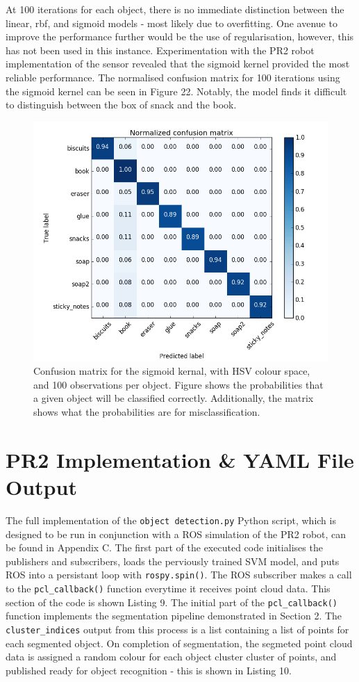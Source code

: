 \documentclass[a4paper]{article}
\begin{document}
At 100 iterations for each object, there is no immediate distinction between the linear, rbf, and sigmoid models - most likely due to overfitting. One avenue to improve the performance further would be the use of regularisation, however, this has not been used in this instance. Experimentation with the PR2 robot implementation of the sensor revealed that the sigmoid kernel provided the most reliable performance. The normalised confusion matrix for 100 iterations using the sigmoid kernel can be seen in Figure 22. Notably, the model finds it difficult to distinguish between the box of snack and the book.
\begin{figure}[h]
	\centering
	\includegraphics[scale=0.55]{normalised_confusion_matrix}
	\caption{Confusion matrix for the sigmoid kernal, with HSV colour space, and 100 observations per object. Figure shows the probabilities that a given object will be classified correctly. Additionally, the matrix shows what the probabilities are for misclassification.}
\end{figure}
\newpage

\section{PR2 Implementation \& YAML File Output}
The full implementation of the \verb|object detection.py| Python script, which is designed to be run in conjunction with a ROS simulation of the PR2 robot, can be found in Appendix C. The first part of the executed code initialises the publishers and subscribers, loads the perviously trained SVM model, and puts ROS into a persistant loop with \verb|rospy.spin()|. The ROS subscriber makes a call to the \verb|pcl_callback()| function everytime it receives point cloud data. This section of the code is shown  Listing 9. The initial part of the \verb|pcl_callback()| function implements the segmentation pipeline demonstrated in Section 2. The \verb|cluster_indices| output from this process is a list containing a list of points for each segmented object. On completion of segmentation, the segmeted point cloud data is assigned a random colour for each object cluster cluster of points, and published ready for object recognition - this is shown in Listing 10.\\
\end{document}
